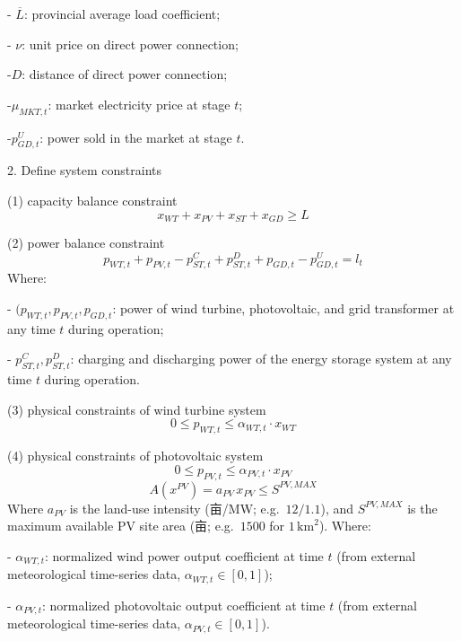 \documentclass{article}
\begin{document}
\noindent - $\overline{L}$: provincial average load coefficient;

\noindent - $\nu$: unit price on direct power connection;

\noindent -$D$: distance of direct power connection;

\noindent -$\mu_{MKT,t}$: market electricity price at stage $t$;

\noindent -$p_{GD,t}^{U}$: power sold in the market at stage $t$.


2. Define system constraints

(1) capacity balance constraint
\begin{equation}
x_{WT} + x_{PV} + x_{ST} + x_{GD} \geq L 
\end{equation}

(2) power balance constraint
\begin{equation}
p_{WT,t} + p_{PV,t} - p_{ST,t}^C + p_{ST,t}^D + p_{GD,t} - p_{GD,t}^{U} = l_t 
\end{equation}
Where:

\noindent - $(p_{WT,t}, p_{PV,t}, p_{GD,t}$: power of wind turbine, photovoltaic, and grid transformer at any time $t$ during operation;

\noindent - $p_{ST,t}^C, p_{ST,t}^D$: charging and discharging power of the energy storage system at any time $t$ during operation.

(3) physical constraints of wind turbine system
\begin{equation}
0 \leq p_{WT,t} \leq \alpha_{WT,t} \cdot x_{WT} 
\end{equation}

(4) physical constraints of photovoltaic system
\begin{equation}
0 \leq p_{PV,t} \leq \alpha_{PV,t} \cdot x_{PV} 
\end{equation}
\begin{equation}
A(x^{PV}) = a_{PV}\, x_{PV} \leq S^{PV,MAX}
\end{equation}
Where $a_{PV}$ is the land-use intensity (亩/MW; e.g.\ $12/1.1$), and $S^{PV,MAX}$ is the maximum available PV site area (亩; e.g.\ $1500$ for $1\,\mathrm{km}^{2}$).
Where:

\noindent - $\alpha_{WT,t}$: normalized wind power output coefficient at time $t$ (from external meteorological time-series data, $\alpha_{WT,t} \in [0,1]$);

\noindent - $\alpha_{PV,t}$: normalized photovoltaic output coefficient at time $t$ (from external meteorological time-series data, $\alpha_{PV,t} \in [0,1]$).
\end{document}
